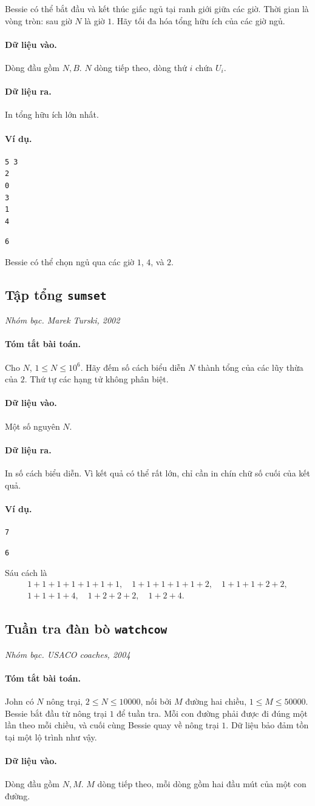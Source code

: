 \documentclass[11pt]{article}
\newcommand{\problem}[4]{%
  \subsection[#1 (#2)]{#1 \hfill {\normalsize\texttt{#2}}}%
  \noindent\textit{#3. #4}\par\smallskip
}
\newcommand{\iosec}[1]{\paragraph{#1}}
\begin{document}
Bessie có thể bắt đầu và kết thúc giấc ngủ tại ranh giới giữa các giờ. Thời
gian là vòng tròn: sau giờ \(N\) là giờ \(1\). Hãy tối đa hóa tổng hữu ích của
các giờ ngủ.

\iosec{Dữ liệu vào.}
Dòng đầu gồm \(N,B\). \(N\) dòng tiếp theo, dòng thứ \(i\) chứa \(U_i\).

\iosec{Dữ liệu ra.}
In tổng hữu ích lớn nhất.

\iosec{Ví dụ.}
\begin{verbatim}
5 3
2
0
3
1
4
\end{verbatim}

\begin{verbatim}
6
\end{verbatim}

Bessie có thể chọn ngủ qua các giờ \(1\), \(4\), và \(2\).

\problem{Tập tổng}{sumset}{Nhóm bạc}{Marek Turski, 2002}

\iosec{Tóm tắt bài toán.}
Cho \(N\), \(1\le N\le 10^6\). Hãy đếm số cách biểu diễn \(N\) thành tổng của
các lũy thừa của \(2\). Thứ tự các hạng tử không phân biệt.

\iosec{Dữ liệu vào.}
Một số nguyên \(N\).

\iosec{Dữ liệu ra.}
In số cách biểu diễn. Vì kết quả có thể rất lớn, chỉ cần in chín chữ số cuối
của kết quả.

\iosec{Ví dụ.}
\begin{verbatim}
7
\end{verbatim}

\begin{verbatim}
6
\end{verbatim}

Sáu cách là
\[
\begin{gathered}
1+1+1+1+1+1+1,\quad
1+1+1+1+1+2,\quad
1+1+1+2+2,\\
1+1+1+4,\quad
1+2+2+2,\quad
1+2+4.
\end{gathered}
\]

\problem{Tuần tra đàn bò}{watchcow}{Nhóm bạc}{USACO coaches, 2004}

\iosec{Tóm tắt bài toán.}
John có \(N\) nông trại, \(2\le N\le 10000\), nối bởi \(M\) đường hai chiều,
\(1\le M\le 50000\). Bessie bắt đầu từ nông trại \(1\) để tuần tra. Mỗi con
đường phải được đi đúng một lần theo mỗi chiều, và cuối cùng Bessie quay về
nông trại \(1\). Dữ liệu bảo đảm tồn tại một lộ trình như vậy.

\iosec{Dữ liệu vào.}
Dòng đầu gồm \(N,M\). \(M\) dòng tiếp theo, mỗi dòng gồm hai đầu mút của một
con đường.
\end{document}
